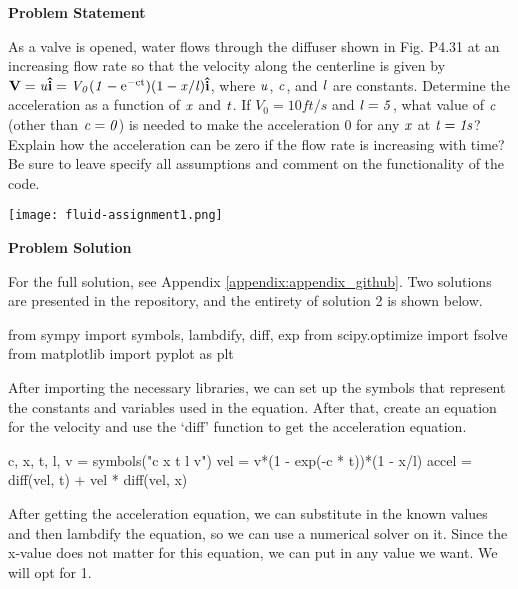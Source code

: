 \begin{tcolorbox}[breakable, enhanced jigsaw, title=ME 571: Assignment \ref{fluid_assignment_1}, 
    colframe=ksu-purple, colback=ksu-gray]

    \textbf{Problem Statement}
    \parindent15pt

    As a valve is opened, water flows through the diffuser shown in Fig. P4.31 at an increasing 
    flow rate so that the velocity along the centerline is given by 
    $ \mathbf{V} = \it{u}\mathbf{\hat{i}}  = V_0(1 - \rm{e}^{-ct})(1 - \it{x/l})\mathbf{\hat{i}} $, 
    where $\it{u}$, $ \it{c} $, and $ \it{l} $ are constants. Determine the acceleration as 
    a function of $ \it{x} $ and $ \it{t} $. If $ V_0 = 10 ft/s $ and $ \it{l} = 5 $, what value 
    of $ \it{c} $ (other than $ \it{c} = 0 $) is needed to make the acceleration 0 for any 
    $ \it{x} $ at $ \it{t} = 1s $? Explain how the acceleration can be zero if the flow rate 
    is increasing with time? Be sure to leave specify all assumptions and comment on the 
    functionality of the code.

    \begin{center}
        \texttt{[image: fluid-assignment1.png]} 
    \end{center}

    \tcblower
    \textbf{Problem Solution}
    \parindent15pt

    For the full solution, see Appendix \ref{appendix:appendix_github}. Two solutions are 
    presented in the repository, and the entirety of solution 2 is shown below.

\begin{python}
from sympy import symbols, lambdify, diff, exp
from scipy.optimize import fsolve
from matplotlib import pyplot as plt
\end{python}

After importing the necessary libraries, we can set up the symbols that represent the 
constants and variables used in the equation. After that, create an equation for the 
velocity and use the `diff' function to get the acceleration equation.

\begin{python}
c, x, t, l, v = symbols("c x t l v")
vel = v*(1 - exp(-c * t))*(1 - x/l)
accel = diff(vel, t) + vel * diff(vel, x)
\end{python}

After getting the acceleration equation, we can substitute in the known values and then 
lambdify the equation, so we can use a numerical solver on it. Since the x-value does 
not matter for this equation, we can put in any value we want. We will opt for 1.


\end{tcolorbox}
